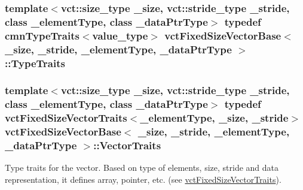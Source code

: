 \subsubsection[{Type\+Traits}]{\setlength{\rightskip}{0pt plus 5cm}template$<$vct\+::size\+\_\+type \+\_\+size, vct\+::stride\+\_\+type \+\_\+stride, class \+\_\+element\+Type, class \+\_\+data\+Ptr\+Type$>$ typedef {\bf cmn\+Type\+Traits}$<$value\+\_\+type$>$ {\bf vct\+Fixed\+Size\+Vector\+Base}$<$ \+\_\+size, \+\_\+stride, \+\_\+element\+Type, \+\_\+data\+Ptr\+Type $>$\+::{\bf Type\+Traits}}\label{classvct_fixed_size_vector_base_ad6d90437534a054c5beb020f588b0b02}
\hypertarget{classvct_fixed_size_vector_base_adacd2ddaf3408250dbcfc8fe5fecfd32}{}
\subsubsection[{Vector\+Traits}]{\setlength{\rightskip}{0pt plus 5cm}template$<$vct\+::size\+\_\+type \+\_\+size, vct\+::stride\+\_\+type \+\_\+stride, class \+\_\+element\+Type, class \+\_\+data\+Ptr\+Type$>$ typedef {\bf vct\+Fixed\+Size\+Vector\+Traits}$<$\+\_\+element\+Type, \+\_\+size, \+\_\+stride$>$ {\bf vct\+Fixed\+Size\+Vector\+Base}$<$ \+\_\+size, \+\_\+stride, \+\_\+element\+Type, \+\_\+data\+Ptr\+Type $>$\+::{\bf Vector\+Traits}}\label{classvct_fixed_size_vector_base_adacd2ddaf3408250dbcfc8fe5fecfd32}
Type traits for the vector. Based on type of elements, size, stride and data representation, it defines array, pointer, etc. (see \hyperlink{classvct_fixed_size_vector_traits}{vct\+Fixed\+Size\+Vector\+Traits}). 

